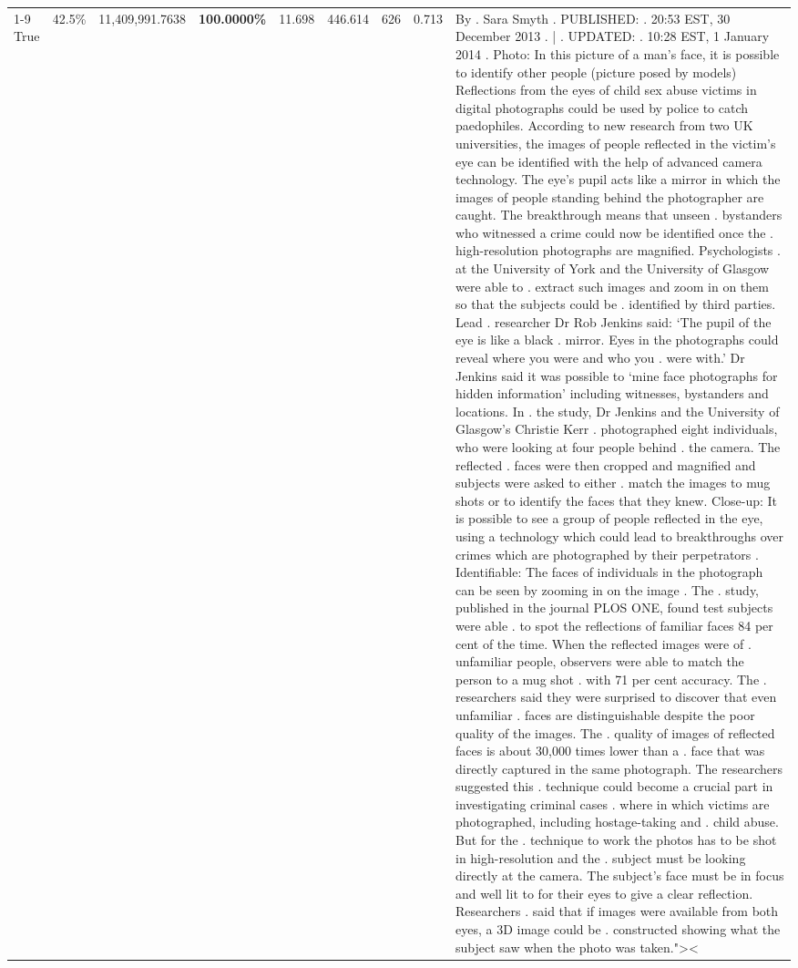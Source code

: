 \begin{table}[H]
\begin{tabular}{lllrlllll}
\cline{1-9}
True & 42.5\% & 11,409,991.7638 & \bfseries \color{red} 100.0000\% & 11.698 & 446.614 & 626 & 0.713 & By . Sara Smyth . PUBLISHED: . 20:53 EST, 30 December 2013 . | . UPDATED: . 10:28 EST, 1 January 2014 . Photo: In this picture of a man's face, it is possible to identify other people (picture posed by models) Reflections from the eyes of child sex abuse victims in digital photographs could be used by police to catch paedophiles. According to new research from two UK universities, the images of people reflected in the victim's eye can be identified with the help of advanced camera technology. The eye's pupil acts like a mirror in which the images of people standing behind the photographer are caught. The breakthrough means that unseen . bystanders who witnessed a crime could now be identified once the . high-resolution photographs are magnified. Psychologists . at the University of York and the University of Glasgow were able to . extract such images and zoom in on them so that the subjects could be . identified by third parties. Lead . researcher Dr Rob Jenkins said: ‘The pupil of the eye is like a black . mirror. Eyes in the photographs could reveal where you were and who you . were with.' Dr Jenkins said it was possible to ‘mine face photographs for hidden information' including witnesses, bystanders and locations. In . the study, Dr Jenkins and the University of Glasgow's Christie Kerr . photographed eight individuals, who were looking at four people behind . the camera. The reflected . faces were then cropped and magnified and subjects were asked to either . match the images to mug shots or to identify the faces that they knew. Close-up: It is possible to see a group of people reflected in the eye, using a technology which could lead to breakthroughs over crimes which are photographed by their perpetrators . Identifiable: The faces of individuals in the photograph can be seen by zooming in on the image . The . study, published in the journal PLOS ONE, found test subjects were able . to spot the reflections of familiar faces 84 per cent of the time. When the reflected images were of . unfamiliar people, observers were able to match the person to a mug shot . with 71 per cent accuracy. The . researchers said they were surprised to discover that even unfamiliar . faces are distinguishable despite the poor quality of the images. The . quality of images of reflected faces is about 30,000 times lower than a . face that was directly captured in the same photograph. The researchers suggested this . technique could become a crucial part in investigating criminal cases . where in which victims are photographed, including hostage-taking and . child abuse. But for the . technique to work the photos has to be shot in high-resolution and the . subject must be looking directly at the camera. The subject's face must be in focus and well lit to for their eyes to give a clear reflection. Researchers . said that if images were available from both eyes, a 3D image could be . constructed showing what the subject saw when the photo was taken.">< \\

\end{tabular}
\end{table}
